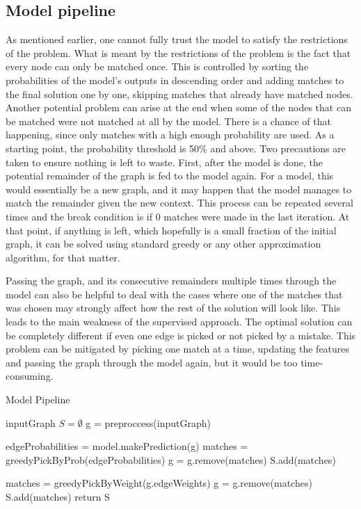 \subsection{Model pipeline}

As mentioned earlier, one cannot fully trust the model to satisfy the restrictions of the problem. What is meant by the restrictions of the problem is the fact that every node can only be matched once. This is controlled by sorting the probabilities of the model's outputs in descending order and adding matches to the final solution one by one, skipping matches that already have matched nodes. Another potential problem can arise at the end when some of the nodes that can be matched were not matched at all by the model. There is a chance of that happening, since only matches with a high enough probability are used. As a starting point, the probability threshold is 50\% and above. Two precautions are taken to ensure nothing is left to waste. First, after the model is done, the potential remainder of the graph is fed to the model again. For a model, this would essentially be a new graph, and it may happen that the model manages to match the remainder given the new context. This process can be repeated several times and the break condition is if 0 matches were made in the last iteration. At that point, if anything is left, which hopefully is a small fraction of the initial graph, it can be solved using standard greedy or any other approximation algorithm, for that matter.

Passing the graph, and its consecutive remainders multiple times through the model can also be helpful to deal with the cases where one of the matches that was chosen may strongly affect how the rest of the solution will look like. This leads to the main weakness of the supervised approach. The optimal solution can be completely different if even one edge is picked or not picked by a mistake. This problem can be mitigated by picking one match at a time, updating the features and passing the graph through the model again, but it would be too time-consuming.

\begin{algorithm}
\caption{Model Pipeline}\label{alg:cap}

\begin{algorithmic}

\State inputGraph
\State $S = \emptyset$
\State g = preproccess(inputGraph)


\State edgeProbabilities = model.makePrediction(g)
\State matches = greedyPickByProb(edgeProbabilities)
\State g = g.remove(matches)
\State S.add(matches)

  \State matches = greedyPickByWeight(g.edgeWeights)
  \State g = g.remove(matches)
  \State S.add(matches)
\EndIf
\EndWhile
\State return S
\end{algorithmic}
\end{algorithm}

